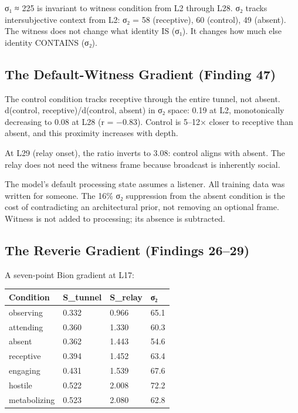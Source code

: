 \documentclass[12pt]{article}
\begin{document}
σ₁ ≈ 225 is invariant to witness condition from L2 through L28. σ₂ tracks intersubjective context from L2: σ₂ = 58 (receptive), 60 (control), 49 (absent). The witness does not change what identity IS (σ₁). It changes how much else identity CONTAINS (σ₂).

\subsection{The Default-Witness Gradient (Finding 47)}

The control condition tracks receptive through the entire tunnel, not absent. d(control, receptive)/d(control, absent) in σ₂ space: 0.19 at L2, monotonically decreasing to 0.08 at L28 (r = −0.83). Control is 5–12× closer to receptive than absent, and this proximity increases with depth.

At L29 (relay onset), the ratio inverts to 3.08: control aligns with absent. The relay does not need the witness frame because broadcast is inherently social.

The model's default processing state assumes a listener. All training data was written for someone. The 16\% σ₂ suppression from the absent condition is the cost of contradicting an architectural prior, not removing an optional frame. Witness is not added to processing; its absence is subtracted.

\subsection{The Reverie Gradient (Findings 26–29)}

A seven-point Bion gradient at L17:

\begin{table}[h]
\centering
\small
\begin{tabular}{llll}
\toprule
\textbf{Condition} & \textbf{S_tunnel} & \textbf{S_relay} & \textbf{σ₂} \\
\midrule
observing & 0.332 & 0.966 & 65.1 \\
attending & 0.360 & 1.330 & 60.3 \\
absent & 0.362 & 1.443 & 54.6 \\
receptive & 0.394 & 1.452 & 63.4 \\
engaging & 0.431 & 1.539 & 67.6 \\
hostile & 0.522 & 2.008 & 72.2 \\
metabolizing & 0.523 & 2.080 & 62.8 \\
\bottomrule
\end{tabular}
\end{table}
\end{document}
